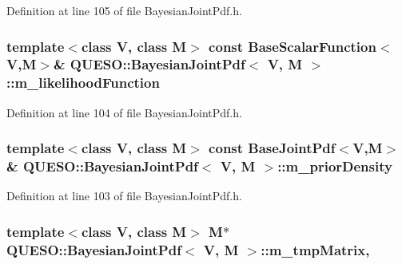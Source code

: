 Definition at line 105 of file Bayesian\-Joint\-Pdf.\-h.

\hypertarget{class_q_u_e_s_o_1_1_bayesian_joint_pdf_a8e2506801de447f8acd187f8edfa330d}{
\subsubsection[{m\-\_\-likelihood\-Function}]{\setlength{\rightskip}{0pt plus 5cm}template$<$class V, class M$>$ const {\bf Base\-Scalar\-Function}$<$V,M$>$\& {\bf Q\-U\-E\-S\-O\-::\-Bayesian\-Joint\-Pdf}$<$ V, M $>$\-::m\-\_\-likelihood\-Function\hspace{0.3cm}{\ttfamily [protected]}}}\label{class_q_u_e_s_o_1_1_bayesian_joint_pdf_a8e2506801de447f8acd187f8edfa330d}


Definition at line 104 of file Bayesian\-Joint\-Pdf.\-h.

\hypertarget{class_q_u_e_s_o_1_1_bayesian_joint_pdf_a3cafafe8c5ea2353eedaecee156f609a}{
\subsubsection[{m\-\_\-prior\-Density}]{\setlength{\rightskip}{0pt plus 5cm}template$<$class V, class M$>$ const {\bf Base\-Joint\-Pdf}$<$V,M$>$\& {\bf Q\-U\-E\-S\-O\-::\-Bayesian\-Joint\-Pdf}$<$ V, M $>$\-::m\-\_\-prior\-Density\hspace{0.3cm}{\ttfamily [protected]}}}\label{class_q_u_e_s_o_1_1_bayesian_joint_pdf_a3cafafe8c5ea2353eedaecee156f609a}


Definition at line 103 of file Bayesian\-Joint\-Pdf.\-h.

\hypertarget{class_q_u_e_s_o_1_1_bayesian_joint_pdf_a686da1b57929c8b506a5e8fe8974603d}{
\subsubsection[{m\-\_\-tmp\-Matrix}]{\setlength{\rightskip}{0pt plus 5cm}template$<$class V, class M$>$ M$\ast$ {\bf Q\-U\-E\-S\-O\-::\-Bayesian\-Joint\-Pdf}$<$ V, M $>$\-::m\-\_\-tmp\-Matrix\hspace{0.3cm}{\ttfamily [mutable]}, {\ttfamily [protected]}}}\label{class_q_u_e_s_o_1_1_bayesian_joint_pdf_a686da1b57929c8b506a5e8fe8974603d}


